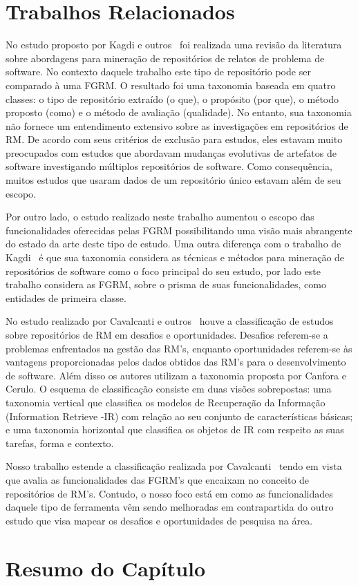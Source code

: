 \section{Trabalhos Relacionados}
\label{sec:map_trabalhos_relacionados}

No estudo proposto por Kagdi e outros~\cite{kagdi2012assigning} foi realizada
uma revisão da literatura sobre abordagens para mi\-ne\-ra\-ção de repositórios de
relatos de problema de software. No contexto daquele trabalho este tipo de
repositório pode ser comparado à uma FGRM\@. O resultado foi uma taxonomia
baseada em quatro classes: o tipo de repositório extraído (o que), o propósito
(por que), o método proposto (como) e o método de avaliação (qualidade). No
entanto, sua taxonomia não fornece um entendimento extensivo sobre as
investigações em repositórios de RM\@. De acordo com seus critérios de exclusão
para estudos, eles estavam muito preocupados com estudos que abordavam mudanças
evolutivas de artefatos de software investigando múltiplos repositórios de
software. Como consequência, muitos estudos que usaram dados de um repositório
único estavam além de seu escopo.

Por outro lado, o estudo realizado neste trabalho aumentou o escopo das
funcionalidades oferecidas pelas FGRM possibilitando uma visão mais abrangente
do estado da arte deste tipo de estudo. Uma outra diferença com o trabalho de
Kagdi~\cite{kagdi2012assigning} é que sua taxonomia considera as técnicas e
métodos para mineração de repositórios de software como o foco principal do seu
estudo, por lado este trabalho considera as FGRM, sobre o prisma de suas
funcionalidades, como entidades de primeira classe.

No estudo realizado por Cavalcanti e outros~\cite{cavalcanti2014challenges}
houve a classificação de estudos sobre repositórios de RM em desafios e
oportunidades.  Desafios referem-se a problemas enfrentados na gestão das RM's,
enquanto oportunidades referem-se às vantagens proporcionadas pelos dados
obtidos das  RM's para o desenvolvimento de software. Além disso os autores
utilizam a taxonomia proposta por Canfora e Cerulo\cite{cerulo2004taxonomy}. O
esquema de classificação consiste em duas visões sobrepostas: uma taxonomia
vertical que classifica os modelos de Recuperação da Informação (Information
Retrieve \@-\@ IR) com relação ao seu conjunto de características básicas; e uma
taxonomia horizontal que classifica os objetos de IR com respeito as suas
tarefas, forma e contexto.

Nosso trabalho estende a classificação realizada por
Cavalcanti~\cite{cavalcanti2014challenges} tendo em vista que avalia as
funcionalidades das FGRM's  que encaixam no conceito de repositórios de RM's.
Contudo, o nosso foco está em como as funcionalidades daquele tipo de ferramenta
vêm sendo melhoradas em contrapartida do outro estudo que visa mapear os
desafios e oportunidades de pesquisa na área.

\section{Resumo do Capítulo}
\label{sec:resumo_capitulo}